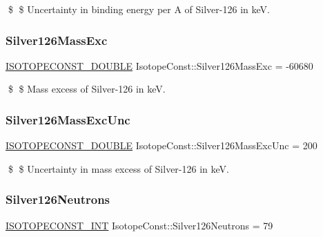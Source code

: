 \$ \$ Uncertainty in binding energy per A of Silver-\/126 in keV. \mbox{\label{group___isotope_const-_silver-_ag126_ga5fac1ac580d66851b2257121fa915e17}} 
\subsubsection{\texorpdfstring{Silver126\+Mass\+Exc}{Silver126MassExc}}
{\footnotesize\ttfamily \mbox{\hyperlink{group___isotope_const-_macros_ga8f45a7272ce02c0b4c65c44636ed719a}{I\+S\+O\+T\+O\+P\+E\+C\+O\+N\+S\+T\+\_\+\+D\+O\+U\+B\+LE}} Isotope\+Const\+::\+Silver126\+Mass\+Exc = -\/60680}

\$ \$ Mass excess of Silver-\/126 in keV. \mbox{\label{group___isotope_const-_silver-_ag126_gac24dca72bea3dcce009e1af08c43dea7}} 
\subsubsection{\texorpdfstring{Silver126\+Mass\+Exc\+Unc}{Silver126MassExcUnc}}
{\footnotesize\ttfamily \mbox{\hyperlink{group___isotope_const-_macros_ga8f45a7272ce02c0b4c65c44636ed719a}{I\+S\+O\+T\+O\+P\+E\+C\+O\+N\+S\+T\+\_\+\+D\+O\+U\+B\+LE}} Isotope\+Const\+::\+Silver126\+Mass\+Exc\+Unc = 200}

\$ \$ Uncertainty in mass excess of Silver-\/126 in keV. \mbox{\label{group___isotope_const-_silver-_ag126_ga99d3ab5c6c75d5df6bb41897aebc64e8}} 
\subsubsection{\texorpdfstring{Silver126\+Neutrons}{Silver126Neutrons}}
{\footnotesize\ttfamily \mbox{\hyperlink{group___isotope_const-_macros_ga5f18360b3e99483a35c32d789e62621c}{I\+S\+O\+T\+O\+P\+E\+C\+O\+N\+S\+T\+\_\+\+I\+NT}} Isotope\+Const\+::\+Silver126\+Neutrons = 79}

